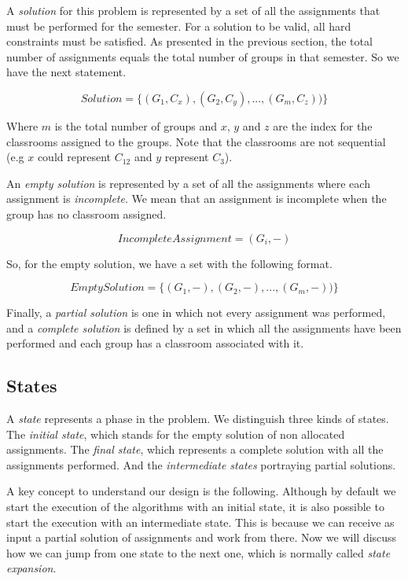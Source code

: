 A \textit{solution} for this problem is represented by a set of all the assignments that must be performed for the semester. For a solution to be valid, all hard constraints must be satisfied. As presented in the previous section, the total number of assignments equals the total number of groups in that semester. So we have the next statement.

\begin{equation}
    Solution = \{ (G_{1}, C_{x}), (G_{2}, C_{y}), ..., (G_{m}, C_{z})) \}
\end{equation}

Where $m$ is the total number of groups and $x$, $y$ and $z$ are the index for the classrooms assigned to the groups. Note that the classrooms are not sequential (e.g $x$ could represent $C_{12}$ and $y$ represent $C_{3}$).

An \textit{empty solution} is represented by a set of all the assignments where each assignment is \textit{incomplete}. We mean that an assignment is incomplete when the group has no classroom assigned.

\begin{equation}
    IncompleteAssignment = (G_{i}, -)
\end{equation}

So, for the empty solution, we have a set with the following format.

\begin{equation}
    EmptySolution = \{ (G_{1}, -), (G_{2}, -), ..., (G_{m}, -)) \}
\end{equation}

Finally, a \textit{partial solution} is one in which not every assignment was performed, and a \textit{complete solution} is defined by a set in which all the assignments have been performed and each group has a classroom associated with it.

\subsection{States}

A \textit{state} represents a phase in the problem. We distinguish three kinds of states. The \textit{initial state}, which stands for the empty solution of non allocated assignments. The \textit{final state}, which represents a complete solution with all the assignments performed. And the \textit{intermediate states} portraying partial solutions.

A key concept to understand our design is the following. Although by default we start the execution of the algorithms with an initial state, it is also possible to start the execution with an intermediate state. This is because we can receive as input a partial solution of assignments and work from there. Now we will discuss how we can jump from one state to the next one, which is normally called \textit{state expansion}.


